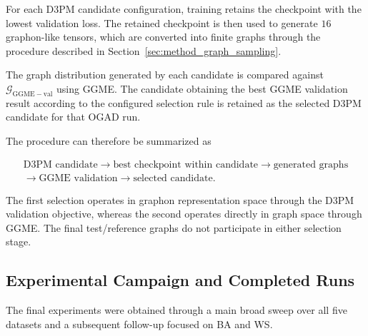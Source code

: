 For each D3PM candidate configuration, training retains the checkpoint with the lowest validation loss. The retained checkpoint is then used to generate \(16\) graphon-like tensors, which are converted into finite graphs through the procedure described in Section~\ref{sec:method_graph_sampling}.

The graph distribution generated by each candidate is compared against \(\mathcal{G}_{\mathrm{GGME-val}}\) using GGME. The candidate obtaining the best GGME validation result according to the configured selection rule is retained as the selected D3PM candidate for that OGAD run.

The procedure can therefore be summarized as

\[
\begin{gathered}
\text{D3PM candidate}
\longrightarrow
\text{best checkpoint within candidate}
\longrightarrow
\text{generated graphs}
\\[0.4em]
\longrightarrow
\text{GGME validation}
\longrightarrow
\text{selected candidate}.
\end{gathered}
\]

The first selection operates in graphon representation space through the D3PM validation objective, whereas the second operates directly in graph space through GGME. The final test/reference graphs do not participate in either selection stage.


\subsection{Experimental Campaign and Completed Runs}
\label{subsec:exp_campaign}

The final experiments were obtained through a main broad sweep over all five datasets and a subsequent follow-up focused on BA and WS.


